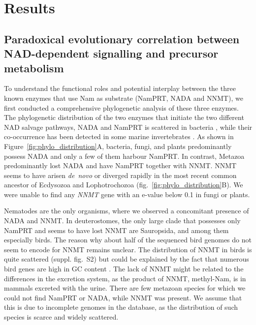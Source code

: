 
\section{Results}

\subsection{Paradoxical evolutionary correlation between NAD-dependent signalling and precursor metabolism}


To understand the functional roles and potential interplay between the three known enzymes that use Nam as substrate (NamPRT, NADA and NNMT), we first conducted a comprehensive phylogenetic analysis of these three enzymes. The phylogenetic distribution of the two enzymes that initiate the two different NAD salvage pathways, NADA and NamPRT is scattered in bacteria \cite{Gazzaniga2009}, while their co-occurrence has been detected in some marine invertebrates \cite{Gossmann2012FEBS}. As shown in Figure~\ref{fig:phylo_distribution}A, bacteria, fungi, and plants predominantly possess NADA and only a few of them harbour NamPRT. In contrast, Metazoa predominantly lost NADA and have NamPRT together with NNMT. NNMT seems to have arisen \textit{de~novo} or diverged rapidly in the most recent common ancestor of Ecdysozoa and Lophotrochozoa (fig.~\ref{fig:phylo_distribution}B). We were unable to find any \textit{NNMT} gene with an e-value below 0.1 in fungi or plants.

Nematodes are the only organisms, where we observed a concomitant presence of NADA and NNMT. In deuterostomes, the only large clade that possesses only NamPRT and seems to have lost NNMT are Sauropsida, and among them especially birds. The reason why about half of the sequenced bird genomes do not seem to encode for NNMT remains unclear. The distribution of NNMT in birds is quite scattered (suppl. fig.~S2) but could be explained by the fact that numerous bird genes are high in GC content \cite{Hron2015}. The lack of NNMT might be related to the differences in the excretion system, as the product of NNMT, methyl-Nam, is in mammals excreted with the urine. There are few metazoan species for which we could not find NamPRT or NADA, while NNMT was present. We assume that this is due to incomplete genomes in the database, as the distribution of such species is scarce and widely scattered.

